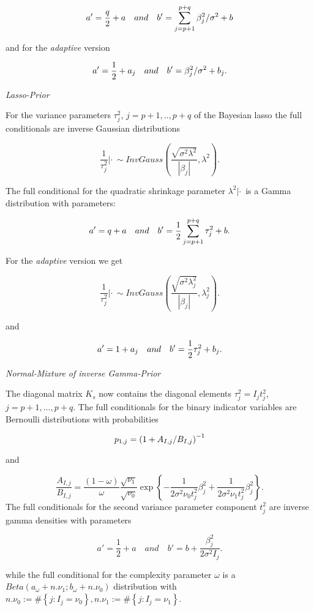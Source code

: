 \documentclass[11pt,a4paper,twoside]{bayesxarticle}
\begin{document}
\[a'=\frac{q}{2} +a\quad {\rm and}\quad b'=\sum _{j=p+1}^{p+q}\beta _{j}^{2} / \sigma^2  +b\]

and for the {\em adaptive} version

\[a'=\frac{1}{2} +a_j\quad {\rm and}\quad b'=\beta _{j}^{2} / \sigma^2  +b_j.\]

{\em Lasso-Prior}

For the variance parameters $\tau _{j}^{2} $, $j=p+1,..,p+q$ of the Bayesian lasso the full conditionals are inverse Gaussian
distributions

\[\frac{1}{\tau _{j}^{2} } |\cdot \, \sim InvGauss\left(\frac{\sqrt{\sigma^2 \lambda ^{2}
} }{\left|\beta _{j} \right|} ,\lambda ^{2} \right).\]

The full conditional for the quadratic shrinkage parameter $\lambda ^{2} |\cdot \, $ is
a Gamma distribution with parameters:

\[a'=q+a\quad {\rm and}\quad b'=\frac{1}{2} \sum _{j=p+1}^{p+q}\tau _{j}^{2}  +b.\]

For the {\em adaptive} version  we get

\[\frac{1}{\tau _{j}^{2} } |\cdot \, \sim InvGauss\left(\frac{\sqrt{\sigma^2 \lambda_j^{2}
} }{\left|\beta _{j} \right|} ,\lambda_j^{2} \right).\]

and

\[a'=1+a_j\quad {\rm and}\quad b'=\frac{1}{2}\tau _{j}^{2}  +b_j.\]


{\em Normal-Mixture of inverse Gamma-Prior}

The diagonal matrix $K_{s} $ now contains the diagonal elements $\tau _{j}^{2} =I_{j} t_{j}^{2} $, $j=p+1,\ldots,p+q$. The full
conditionals for the binary indicator variables are Bernoulli distributions with probabilities

\[p_{1,j} =\left({1+A_{I,j} \mathord{\left/ {\vphantom {1+A_{I,j}  B_{I,j} }} \right.
\kern-\nulldelimiterspace} B_{I,j} } \right)^{-1} \]

and

\[\frac{A_{I,j} }{B_{I,j} } =\frac{\left(1-\omega \right)}{\omega } \frac{\sqrt{
\nu _{1} } }{\sqrt{\nu _{0} } } \exp \left\{-\frac{1}{2\sigma^2 \nu _{0} t_{j}^{2} } \beta
_{j}^{2} +\frac{1}{2\sigma^2 \nu _{1} t_{j}^{2} } \beta _{j}^{2} \right\}.\]
The full conditionals for the second variance parameter component $t_{j}^{2} $ are
inverse gamma densities with parameters

\[a'=\frac{1}{2} +a\quad and\quad b'=b+\frac{\beta _{j}^{2} }{2\sigma^2I_{j} } .\]

while the full conditional for the complexity parameter $\omega $ is a $Beta\left(a_{\omega}+n.
\nu _{1} ;b_{\omega}+n.\nu _{0} \right)$ distribution with $n.\nu _{0} :=\# \left\{j:I_{j}
=\nu _{0} \right\},n.\nu _{1} :=\# \left\{j:I_{j} =\nu _{1} \right\}$.
\end{document}
